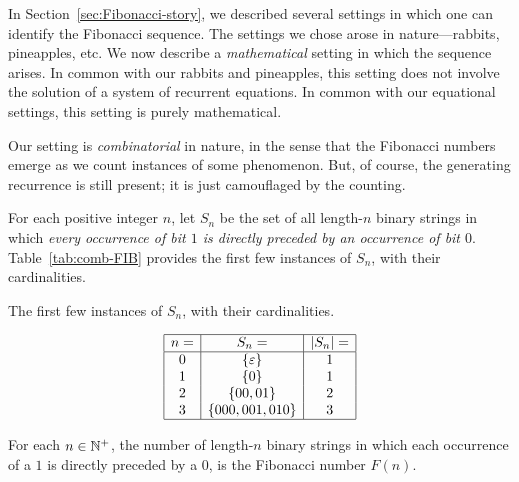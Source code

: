 In Section~\ref{sec:Fibonacci-story}, we described several settings in which one can identify the Fibonacci sequence.  The settings we chose arose in nature---rabbits, pineapples, etc.  We now describe a {\em mathematical} setting in which the sequence arises.  In common with our rabbits and pineapples, this setting does not involve the solution of a system of recurrent equations.  In common with our equational settings, this setting is purely mathematical.

\medskip

Our setting is {\em combinatorial} in nature, in the sense that the Fibonacci numbers emerge as we count instances of some phenomenon. But, of course, the generating recurrence is still present; it is just camouflaged by the counting.

\bigskip

For each positive integer $n$, let $S_n$ be the set of all length-$n$ binary strings in which {\em every occurrence of bit $1$ is directly preceded by an occurrence of bit $0$}.  Table~\ref{tab:comb-FIB} provides the first few instances of $S_n$, with their cardinalities.
\begin{table}[hbt]
\label{tab:comb-FIB}
\caption{The first few instances of $S_n$, with their cardinalities.}
\[
\begin{array}{|c|c|c|}
\hline
n = & S_n =               & |S_n| = \\
\hline
0   & \{ \varepsilon\}    & 1 \\ 
1   & \{ 0 \}             & 1 \\
2   & \{ 00, 01 \}        & 2 \\
3   & \{ 000, 001, 010 \} & 3 \\
\hline
\end{array}
\]
\end{table}


\begin{prop}
\label{thm:FIBO-from-sparse-bitstrings}
For each $n \in \mathbb{N}^+$, the number of length-$n$ binary strings in which each occurrence of a $1$ is directly preceded by a $0$, is the Fibonacci number $F(n)$.
\end{prop}

